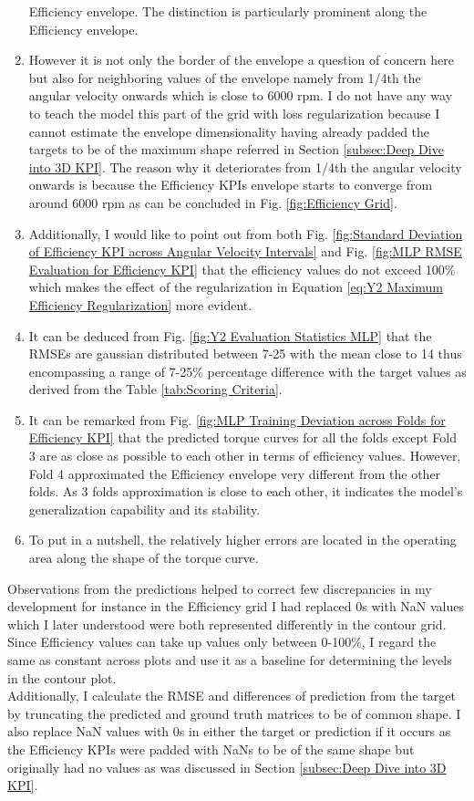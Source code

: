 \documentclass{report} %
\begin{document}
\begin{enumerate}[nosep]
    Efficiency envelope. The distinction is particularly prominent along the Efficiency envelope.
    \item However it is not only the border of the envelope a question of concern here but also for neighboring values of the envelope namely from 1/4th the 
    angular velocity onwards which is close to 6000 rpm. 
    I do not have any way to teach the model this part of the grid with loss regularization because I cannot estimate the envelope dimensionality having already padded 
    the targets to be of the maximum shape referred in Section \ref{subsec:Deep Dive into 3D KPI}. The reason why it deteriorates from 1/4th the angular velocity onwards is 
    because the Efficiency \ac{KPI}s envelope starts to converge from around 6000 rpm as can be concluded in Fig. \ref{fig:Efficiency Grid}. 
    \item Additionally, I would like to point out from both Fig. \ref{fig:Standard Deviation of Efficiency KPI across Angular Velocity Intervals} and Fig. 
    \ref{fig:MLP RMSE Evaluation for Efficiency KPI} that the efficiency values do not exceed 100\% which makes the effect of the regularization in Equation 
    \ref{eq:Y2 Maximum Efficiency Regularization} more evident.
    \item It can be deduced from Fig. \ref{fig:Y2 Evaluation Statistics MLP} that the \ac{RMSE}s are gaussian distributed between 7-25 with the mean close to 14 thus 
    encompassing a range of 7-25\% percentage difference with the target values as derived from the Table \ref{tab:Scoring Criteria}.
    \item It can be remarked from Fig. \ref{fig:MLP Training Deviation across Folds for Efficiency KPI} that the predicted torque curves for all the folds except Fold 3 
    are as close as possible to each other in terms of efficiency values. However, Fold 4 approximated the Efficiency envelope very different from the other folds. 
    As 3 folds approximation is close to each other, it indicates the model's generalization capability and its stability.
    \item To put in a nutshell, the relatively higher errors are located in the operating area along the shape of the torque curve.\\
\end{enumerate}

Observations from the predictions helped to correct few discrepancies in my development for instance in the Efficiency grid I had replaced 0s with \ac{NaN} values which 
I later understood were both represented differently in the contour grid. Since Efficiency values can take up values only between 0-100\%, I regard the same as constant 
across plots and use it as a baseline for determining the levels in the contour plot.\\
Additionally, I calculate the \ac{RMSE} and differences of prediction from the target by truncating the predicted and ground truth matrices to be of common shape.
I also replace \ac{NaN} values with 0s in either the target or prediction if it occurs as the Efficiency \ac{KPI}s were padded with \ac{NaN}s to be of the same shape 
but originally had no values as was discussed in Section \ref{subsec:Deep Dive into 3D KPI}.
\end{document}
